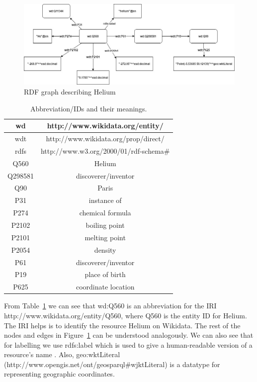\documentclass[12 pt, a4paper]{report}
\theoremstyle{definition}
\begin{document}
\begin{figure}[t]
  \centering
  \includegraphics[width=0.75 \linewidth]{images/rdf_graph.jpg}
  \caption{RDF graph describing Helium}
  \label{fig:figure 2}
\end{figure}

\begin{table}[b!]
	\begin{center}
		\caption{Abbreviation/IDs and their meanings.}
		\label{tab: table 1}
		\begin{tabular}{c|c}
			wd & http://www.wikidata.org/entity/ \\ \hline
			wdt & http://www.wikidata.org/prop/direct/ \\ \hline
			rdfs & http://www.w3.org/2000/01/rdf-schema\# \\ \hline
			Q560 & Helium \\ \hline
			Q298581	& discoverer/inventor \\ \hline
			Q90 & Paris \\ \hline
			P31	& instance of \\ \hline
			P274 & chemical formula \\ \hline
			P2102 & boiling point \\ \hline
			P2101 & melting point \\ \hline
			P2054 & density \\ \hline
			P61	& discoverer/inventor \\ \hline
			P19	 & place of birth \\ \hline
			P625 & coordinate location
		\end{tabular}
	\end{center}
\end{table}

From Table~\ref{tab: table 1} we can see that wd:Q560 is an abbreviation for the IRI http://www.wikidata.org/entity/Q560, where Q560 is the entity ID for Helium. The IRI helps is to identify the resource Helium on Wikidata. The rest of the nodes and edges in Figure~\ref{fig:figure 2} can be understood analogously. We can also see that for labelling we use rdfs:label which is used to give a human-readable version of a resource's name \cite{Brickley2014} . Also, geo:wktLiteral (http://www.opengis.net/ont/geosparql\#wjktLiteral) is a datatype for representing geographic coordinates.
\end{document}
